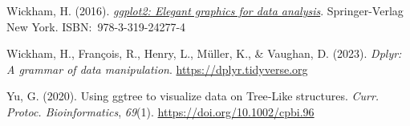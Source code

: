 \documentclass[
]{article}
\newlength{\cslhangindent}
\newenvironment{CSLReferences}[2] %
 {\begin{list}{}{%
  \setlength{\itemindent}{0pt}
  \setlength{\leftmargin}{0pt}
  \setlength{\parsep}{0pt}
  \ifodd #1
   \setlength{\leftmargin}{\cslhangindent}
   \setlength{\itemindent}{-1\cslhangindent}
  \fi
  \setlength{\itemsep}{#2\baselineskip}}}
 {\end{list}}
\begin{document}
\begin{CSLReferences}{1}{0}
Wickham, H. (2016). \emph{\href{https://ggplot2.tidyverse.org}{ggplot2:
Elegant graphics for data analysis}}. Springer-Verlag New York.
ISBN:~978-3-319-24277-4

Wickham, H., François, R., Henry, L., Müller, K., \& Vaughan, D. (2023).
\emph{Dplyr: A grammar of data manipulation}.
\url{https://dplyr.tidyverse.org}

Yu, G. (2020). Using ggtree to visualize data on {Tree‐Like} structures.
\emph{Curr. Protoc. Bioinformatics}, \emph{69}(1).
\url{https://doi.org/10.1002/cpbi.96}

\end{CSLReferences}
\end{document}

